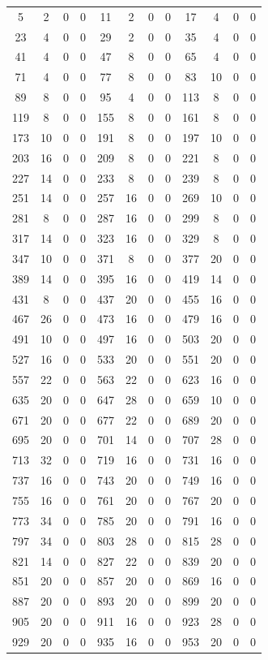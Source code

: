 \documentclass[12pt, 14paper,reqno]{amsart}
\theoremstyle{plain}
\theoremstyle{proof}
\numberwithin{equation}{section}
\begin{document}
\begin{center}
\begin{longtable}{cccc|cccc|cccc}
5 & 2 & 0& 0& 11 &2 &0& 0&17& 4& 0& 0\\
23 &4 &0 &0 &29 &2& 0& 0&35& 4 &0 &0 \\
41& 4& 0 &0 &47 &8& 0& 0&65& 4& 0& 0\\
71 &4& 0& 0&77& 8& 0& 0& 83& 10& 0& 0\\
89 &8 &0& 0&95& 4& 0& 0&113 &8 &0 &0 \\
119 &8& 0& 0&155& 8& 0& 0&161& 8 &0 &0 \\
173 &10& 0& 0&191& 8& 0& 0&197& 10& 0& 0\\
203& 16& 0& 0&209& 8& 0& 0&221 &8 &0 &0 \\
227& 14 &0& 0&233& 8& 0& 0&239 &8 &0& 0\\
251& 14& 0& 0&257& 16& 0& 0 &269& 10& 0& 0\\ 
281& 8& 0& 0&287& 16& 0& 0&299& 8& 0& 0\\
317& 14& 0& 0&323 &16 &0& 0&329& 8 &0 &0 \\
347 &10& 0& 0&371& 8& 0& 0&377 &20 &0 &0 \\
389 &14& 0& 0&395& 16& 0& 0&419& 14& 0& 0\\
431& 8& 0& 0&437& 20& 0& 0&455& 16& 0& 0\\
467& 26& 0& 0&473 &16& 0 &0&479& 16& 0& 0\\
491& 10& 0& 0&497& 16& 0& 0&503& 20& 0& 0\\
527& 16 &0& 0&533& 20& 0& 0&551& 20 &0& 0\\
557& 22& 0& 0&563& 22& 0& 0&623& 16& 0& 0\\
635& 20& 0 &0 &647& 28& 0& 0&659& 10& 0& 0\\
671& 20& 0& 0&677& 22& 0& 0&689 &20& 0& 0\\
695& 20& 0& 0&701& 14& 0& 0&707& 28& 0& 0\\
713 &32& 0& 0&719 &16& 0& 0& 731& 16& 0& 0\\
737& 16& 0& 0&743& 20& 0& 0&749 &16 &0 &0\\
755& 16& 0& 0&761& 20& 0& 0&767& 20& 0& 0\\
773& 34& 0& 0&785& 20& 0 &0 &791& 16& 0& 0\\
797& 34& 0& 0&803& 28& 0& 0&815& 28& 0& 0\\
821 &14& 0& 0& 827& 22& 0& 0&839& 20& 0 &0\\
851 &20& 0 &0&857& 20& 0 &0 &869& 16& 0 &0\\
887 &20& 0& 0& 893& 20& 0& 0 &899& 20& 0 &0 \\
905& 20& 0 &0 &911 &16& 0& 0& 923 &28& 0 &0 \\
929& 20& 0& 0&935& 16 &0 &0&953& 20& 0& 0\\

\end{longtable}
\end{center}
\end{document}
